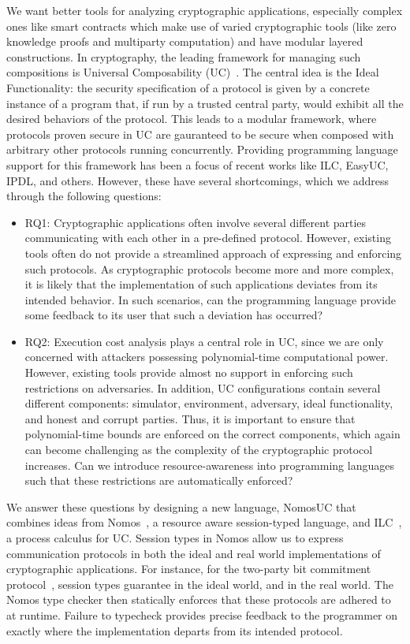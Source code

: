 We want better tools for analyzing cryptographic applications, especially complex ones like smart contracts which make use of varied cryptographic tools (like zero knowledge proofs and multiparty computation) and have modular layered constructions.
In cryptography, the leading framework for managing such compositions is Universal Composability (UC)~\cite{uc}.
The central idea is the Ideal Functionality: the security specification of a protocol is given by a concrete instance of a program that, if run by a trusted central party, would exhibit all the desired behaviors of the protocol.
This leads to a modular framework, where protocols proven secure in UC are gauranteed to be secure when composed with arbitrary other protocols running concurrently.
Providing programming language support for this framework has been a focus of recent works like ILC, EasyUC, IPDL, and others. However, these have several shortcomings, which we address through the following questions:

\begin{itemize}
\item RQ1: Cryptographic applications often involve several different parties communicating
with each other in a pre-defined protocol.
However, existing tools often do not provide a streamlined approach of expressing and enforcing
such protocols.
As cryptographic protocols become more and more complex, it is likely that the implementation
of such applications deviates from its intended behavior.
In such scenarios, can the programming language provide some feedback to its user that such
a deviation has occurred?

\item RQ2: Execution cost analysis plays a central role in UC, since we are only concerned with
attackers possessing polynomial-time computational power.
However, existing tools provide almost no support in enforcing such restrictions on adversaries.
In addition, UC configurations contain several different components: simulator, environment,
adversary, ideal functionality, and honest and corrupt parties.
Thus, it is important to ensure that polynomial-time bounds are enforced on the correct
components, which again can become challenging as the complexity of the cryptographic protocol
increases.
Can we introduce resource-awareness into programming languages such that these restrictions
are automatically enforced?
\end{itemize}

We answer these questions by designing a new language, NomosUC that combines ideas from
Nomos~\cite{dasnomos}, a resource aware session-typed language, and ILC~\cite{ilc},
a process calculus for UC.
Session types in Nomos allow us to express communication protocols in both the ideal and
real world implementations of cryptographic applications.
For instance, for the two-party bit commitment protocol~\cite{}, session types guarantee
 in the ideal world, and  in the
real world.
The Nomos type checker then statically enforces that these protocols are adhered to at runtime.
Failure to typecheck provides precise feedback to the programmer on exactly where the
implementation departs from its intended protocol.

